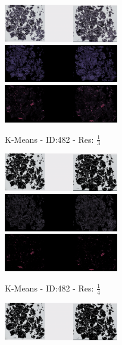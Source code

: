 \documentclass[letterpaper,10pt,oneside]{article}
\begin{document}
\begin{figure}[hbtp]
  \begin{subfigure}[b]{5cm}
    \includegraphics[width=5cm]{visualization/results/kmeans/res_reduce_3/Region_0_PO14-00482B3_1_2_201404171123.png}
    \includegraphics[width=5cm]{visualization/results/kmeans/res_reduce_3/Region_1_PO14-00482B3_1_2_201404171123.png}
    \includegraphics[width=5cm]{visualization/results/kmeans/res_reduce_3/Region_2_PO14-00482B3_1_2_201404171123.png}
    \caption{K-Means - ID:482 - Res: $\frac{1}{3}$}
  \end{subfigure}
  \begin{subfigure}[b]{5cm}
    \includegraphics[width=5cm]{visualization/results/kmeans/res_reduce_4/Region_0_PO14-00482B3_1_2_201404171123.png}
    \includegraphics[width=5cm]{visualization/results/kmeans/res_reduce_4/Region_1_PO14-00482B3_1_2_201404171123.png}
    \includegraphics[width=5cm]{visualization/results/kmeans/res_reduce_4/Region_2_PO14-00482B3_1_2_201404171123.png}
    \caption{K-Means - ID:482 - Res: $\frac{1}{4}$}
  \end{subfigure}
  \begin{subfigure}[b]{5cm}
    \includegraphics[width=5cm]{visualization/results/kmeans/res_reduce_5/Region_0_PO14-00482B3_1_2_201404171123.png}

\end{subfigure}
\end{figure}
\end{document}
